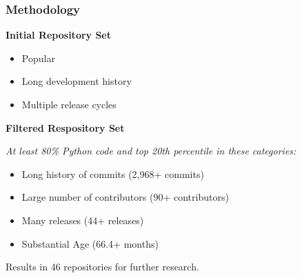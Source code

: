 \documentclass{beamer}
\begin{document}
\begin{frame}
  \frametitle{Methodology}
  \textbf{Initial Repository Set}
  \begin{itemize}
    \item Popular
    \item Long development history
    \item Multiple release cycles
  \end{itemize}

  \vspace{0.35cm}
  \textbf{Filtered Respository Set}
  
  \emph{At least 80\% Python code and top 20th percentile in these categories:}
  \begin{itemize}
    \item Long history of commits (2,968+ commits)
    \item Large number of contributors (90+ contributors)
    \item Many releases (44+ releases)
    \item Substantial Age (66.4+ months)
  \end{itemize}

  \vspace{0.35cm}
  Results in 46 repositories for further research.
\end{frame}
\end{document}
